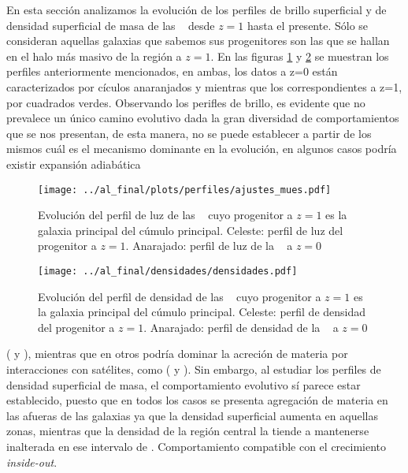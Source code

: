 En esta secci\'on analizamos la evoluci\'on de los perfiles
de brillo superficial y de densidad superficial de masa de las \bcgs~
desde $z=1$ hasta el presente. S\'olo se consideran aquellas galaxias que sabemos
sus progenitores son las que se hallan en el halo m\'as masivo de la regi\'on a $z=1$.
En las figuras \ref{fig:perfmu} y \ref{fig:perfdens} se muestran los perfiles anteriormente
mencionados, en ambas, los datos a z=0 est\'an caracterizados por c\'iculos anaranjados y 
mientras que los correspondientes a z=1, por cuadrados verdes. Observando los perifles
de brillo, es evidente que no prevalece un \'unico camino evolutivo
dada la gran diversidad de comportamientos que se nos presentan,
de esta manera, no se puede establecer a partir de los
mismos cu\'al es el mecanismo dominante en la evoluci\'on, en algunos
casos podr\'ia existir expansi\'on adiab\'atica 

\begin{figure}[H]
\vspace*{-0.7cm}
 \texttt{[image: ../al\_final/plots/perfiles/ajustes\_mues.pdf]}
\caption{Evoluci\'on del perfil de luz de las \bcgs~ cuyo progenitor a $z=1$ es la galaxia principal del c\'umulo principal. Celeste: perfil
de luz del progenitor a $z=1$. Anarajado: perfil de luz de la \bcg~ a $z=0$}
\label{fig:perfmu}
\end{figure}

\begin{figure}[H]
 \texttt{[image: ../al\_final/densidades/densidades.pdf]}
\caption{Evoluci\'on del perfil de densidad de las \bcgs~ cuyo progenitor a $z=1$ es la galaxia principal del c\'umulo principal. Celeste: perfil
de densidad del progenitor a $z=1$. Anarajado: perfil de densidad de la \bcg~ a $z=0$}
\label{fig:perfdens}
\end{figure}


( y ), mientras que en otros podr\'ia dominar
la acreci\'on de materia por interacciones con sat\'elites, como
( y ). Sin embargo, al estudiar los perfiles
de densidad superficial de masa,
el comportamiento evolutivo s\'i parece estar establecido, puesto que
en todos los casos se presenta agregaci\'on de materia en las afueras
de las galaxias ya que la densidad superficial aumenta en
aquellas zonas, mientras que la densidad de la regi\'on central la tiende
a mantenerse inalterada en ese intervalo de \z. Comportamiento compatible
con el crecimiento \textit{inside-out}.

